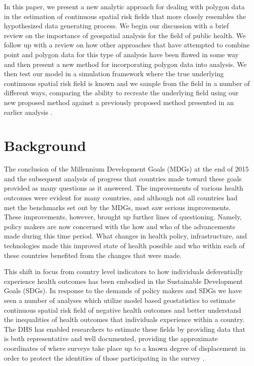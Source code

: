 \documentclass{article}
\begin{document}
In this paper, we present a new analytic approach for dealing with polygon data in the estimation of continuous spatial risk fields that more closely resembles the hypothesized data generating process. We begin our discussion with a brief review on the importance of geospatial analysis for the field of public health. We follow up with a review on how other approaches that have attempted to combine point and polygon data for this type of analysis have been flawed in some way and then present a new method for incorporating polygon data into analysis. We then test our model in a simulation framework where the true underlying continuous spatial risk field is known and we sample from the field in a number of different ways, comparing the ability to recreate the underlying field using our new proposed method against a previously proposed method presented in an earlier analysis \cite{Utazi2018a}.

\section{Background}\label{background}

The conclusion of the Millennium Development Goals (MDGs) at the end of 2015 and the subsequent analysis of progress that countries made toward these goals provided as many questions as it answered. The improvements of various health outcomes were evident for many countries, and although not all countries had met the benchmarks set out by the MDGs, most saw serious improvements. These improvements, however, brought up further lines of questioning. Namely, policy makers are now concerned with the how and who of the advancements made during this time period. What changes in health policy, infrastructure, and technologies made this improved state of health possible and who within each of these countries benefited from the changes that were made. 

This shift in focus from country level indicators to how individuals deferentially experience health outcomes has been embodied in the Sustainable Development Goals (SDGs). In response to the demands of policy makers and SDGs we have seen a number of analyses which utilize model based geostatistics to estimate continuous spatial risk field of negative health outcomes and better understand the inequalities of health outcomes that individuals experience within a country. The DHS has enabled researchers to estimate these fields by providing data that is both representative and well documented, providing the approximate coordinates of where surveys take place up to a known degree of displacement in order to protect the identities of those participating in the survey \cite{Burgert-Brucker2016, Gething2015}. 
\end{document}
